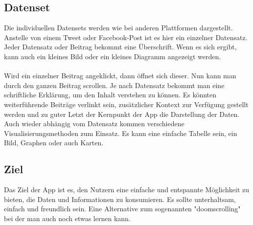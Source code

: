 \subsection{Datenset}
%
Die individuellen Datensets werden wie bei anderen Plattformen dargestellt. Anstelle von einem Tweet oder Facebook-Post ist es hier ein einzelner Datensatz. Jeder Datensatz oder Beitrag bekommt eine
Überschrift. Wenn es sich ergibt, kann auch ein kleines Bild oder ein kleines Diagramm angezeigt werden.
\\
\\
Wird ein einzelner Beitrag angeklickt, dann öffnet sich dieser. Nun kann man durch den ganzen Beitrag scrollen. Je nach Datensatz bekommt man eine schriftliche Erklärung, um den Inhalt verstehen zu können.
Es könnten weiterführende Beiträge verlinkt sein, zusätzlicher Kontext zur Verfügung gestellt werden und zu guter Letzt der Kernpunkt der App die Darstellung der Daten.
Auch wieder abhängig vom Datensatz kommen verschiedene Visualisierungsmethoden zum Einsatz. Es kann eine einfache Tabelle sein, ein Bild, Graphen oder auch Karten.
%
\subsection{Ziel}
%
Das Ziel der App ist es, den Nutzern eine einfache und entspannte Möglichkeit zu bieten, die Daten und Informationen zu konsumieren. Es sollte unterhaltsam, einfach und freundlich sein.
Eine Alternative zum sogenannten "doomscrolling" bei der man auch noch etwas lernen kann.